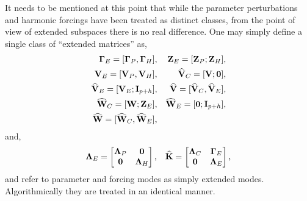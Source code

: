 It needs to be mentioned at this point that while the parameter perturbations and harmonic forcings have been treated as distinct classes, from the point of view of extended subspaces there is no real difference. One may simply define a single class of ``extended matrices'' as,
\begin{equation}
	\label{eqn:single_class}
\begin{aligned}
	\mathbf{\Gamma}_{E} = [\mathbf{\Gamma}_{P}, \mathbf{\Gamma}_{H}], && \mathbf{Z}_{E} = [\mathbf{Z}_{P}; \mathbf{Z}_{H}], \\
	\mathbf{V}_{E} = [\mathbf{V}_{P}, \mathbf{V}_{H}], && \widehat{\mathbf{V}}_{C} = [\mathbf{V}; \mathbf{0}], \\
	\widehat{\mathbf{V}}_{E} = [\mathbf{V}_{E}; \mathbf{I}_{p+h}], && \widehat{\mathbf{V}} = [\widehat{\mathbf{V}}_{C}, \widehat{\mathbf{V}}_{E}], \\
	\widehat{\mathbf{W}}_{C} = [\mathbf{W}; \mathbf{Z}_{E}], && \widehat{\mathbf{W}}_{E} = [\mathbf{0}; \mathbf{I}_{p+h}],  \\
	\widehat{\mathbf{W}} = [\widehat{\mathbf{W}}_{C}, \widehat{\mathbf{W}}_{E}], &&
\end{aligned} 
\end{equation}
and,
\begin{eqnarray}
	\label{eqn:khat2}
	\mathbf{\Lambda}_{E} =
	\begin{bmatrix}
		\mathbf{\Lambda}_{P} & \mathbf{0} \\ 
		\mathbf{0} &  \mathbf{\Lambda}_{H} 
	\end{bmatrix},
	&&
	\mathbf{\widehat{K}} =
	\begin{bmatrix}
		\mathbf{\Lambda}_{C} & \mathbf{\Gamma}_{E} \\ 
		\mathbf{0} &  \mathbf{\Lambda}_{E} 
	\end{bmatrix},
\end{eqnarray}
and refer to parameter and forcing modes as simply extended modes. Algorithmically they are treated in an identical manner.

